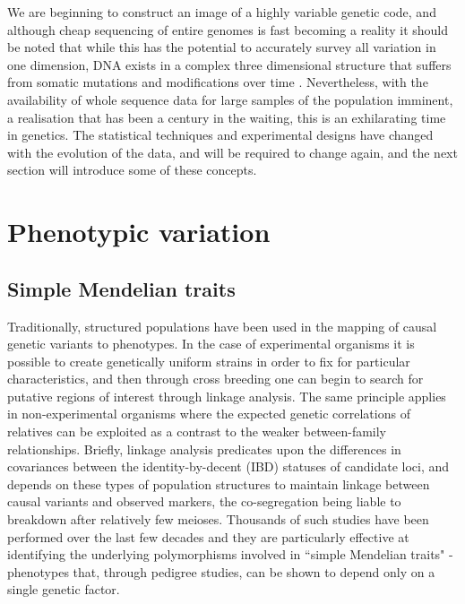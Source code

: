 We are beginning to construct an image of a highly variable genetic code, and although cheap sequencing of entire genomes is fast becoming a reality it should be noted that while this has the potential to accurately survey all variation in one dimension, DNA exists in a complex three dimensional structure \citep{Duan2010} that suffers from somatic mutations and modifications over time \citep{Pleasance2010}. Nevertheless, with the availability of whole sequence data for large samples of the population imminent, a realisation that has been a century in the waiting, this is an exhilarating time in genetics. The statistical techniques and experimental designs have changed with the evolution of the data, and will be required to change again, and the next section will introduce some of these concepts.


\section{Phenotypic variation}

\subsection{Simple Mendelian traits}

Traditionally, structured populations have been used in the mapping of causal genetic variants to phenotypes. In the case of experimental organisms it is possible to create genetically uniform strains in order to fix for particular characteristics, and then through cross breeding one can begin to search for putative regions of interest through linkage analysis. The same principle applies in non-experimental organisms where the expected genetic correlations of relatives can be exploited as a contrast to the weaker between-family relationships. Briefly, linkage analysis predicates upon the differences in covariances between the identity-by-decent (IBD) statuses of candidate loci, and depends on these types of population structures to maintain linkage between causal variants and observed markers, the co-segregation being liable to breakdown after relatively few meioses. Thousands of such studies have been performed over the last few decades and they are particularly effective at identifying the underlying polymorphisms involved in ``simple Mendelian traits" - phenotypes that, through pedigree studies, can be shown to depend only on a single genetic factor.

